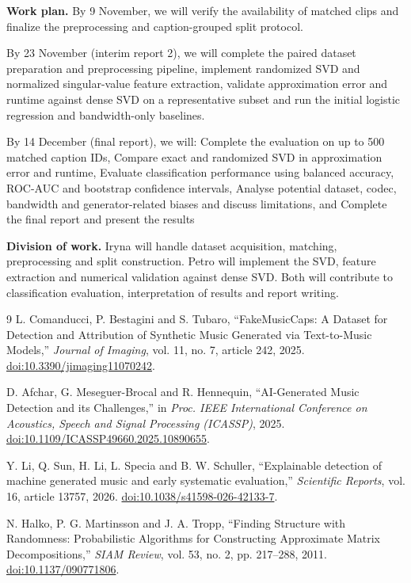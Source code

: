 \documentclass[11pt,a4paper]{article}
\theoremstyle{plain}
\theoremstyle{definition}
\theoremstyle{remark}
\newcommand{\bodyend}{\label{body-end}}
\begin{document}
\textbf{Work plan.}
By 9 November, we will verify the availability of matched clips and finalize
the preprocessing and caption-grouped split protocol.

By 23 November (interim report 2), we will
complete the paired dataset preparation and preprocessing pipeline,
implement randomized SVD and normalized singular-value feature extraction,
validate approximation error and runtime against dense SVD on a
representative subset and
run the initial logistic regression and bandwidth-only baselines.

By 14 December (final report), we will:
Complete the evaluation on up to 500 matched caption IDs,
Compare exact and randomized SVD in approximation error and runtime,
Evaluate classification performance using balanced accuracy,
ROC-AUC and bootstrap confidence intervals,
Analyse potential dataset, codec, bandwidth and generator-related
biases and discuss limitations, and
Complete the final report and present the results

\textbf{Division of work.} Iryna will handle dataset acquisition, matching,
preprocessing and split construction. Petro will implement the SVD,
feature extraction and numerical validation against dense
SVD. Both will contribute to classification evaluation, interpretation of
results and report writing.

\bodyend

\clearpage
\begin{thebibliography}{9}
L. Comanducci, P. Bestagini and S. Tubaro,
``FakeMusicCaps: A Dataset for Detection and Attribution of Synthetic Music
Generated via Text-to-Music Models,'' \emph{Journal of Imaging}, vol. 11,
no. 7, article 242, 2025.
\href{https://doi.org/10.3390/jimaging11070242}{doi:10.3390/jimaging11070242}.

D. Afchar, G. Meseguer-Brocal and R. Hennequin,
``AI-Generated Music Detection and its Challenges,'' in
\emph{Proc. IEEE International Conference on Acoustics, Speech and Signal
Processing (ICASSP)}, 2025.
\href{https://doi.org/10.1109/ICASSP49660.2025.10890655}{doi:10.1109/ICASSP49660.2025.10890655}.

Y. Li, Q. Sun, H. Li, L. Specia and B. W. Schuller,
``Explainable detection of machine generated music and early systematic
evaluation,'' \emph{Scientific Reports}, vol. 16, article 13757, 2026.
\href{https://doi.org/10.1038/s41598-026-42133-7}{doi:10.1038/s41598-026-42133-7}.

N. Halko, P. G. Martinsson and J. A. Tropp,
``Finding Structure with Randomness: Probabilistic Algorithms for Constructing
Approximate Matrix Decompositions,'' \emph{SIAM Review}, vol. 53, no. 2,
pp. 217--288, 2011.
\href{https://doi.org/10.1137/090771806}{doi:10.1137/090771806}.
\end{thebibliography}
\end{document}
